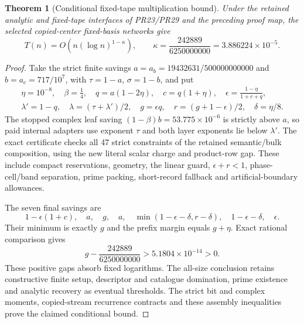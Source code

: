 \documentclass[11pt]{article}
\newtheorem{theorem}{Theorem}
\begin{document}
\begin{theorem}[Conditional fixed-tape multiplication bound]
Under the retained analytic and fixed-tape interfaces of PR23/PR29
and the preceding proof map, the selected copied-center fixed-basis networks give
\[
 T(n)=O\!\left(n(\log n)^{1-\kappa}\right),\qquad
 \boxed{\kappa=\frac{242889}{6250000000}=3.886224\times10^{-5}}.
\]
\end{theorem}
\begin{proof}
Take the strict finite savings $a=a_b=19432631/500000000000$ and
$b=a_c=717/10^7$, with $\tau=1-a$, $\sigma=1-b$, and put
\[
\begin{gathered}
 \eta=10^{-8},\quad\beta=\tfrac14,\quad q=a(1-2\eta),\quad
 c=q(1+\eta),\quad\epsilon=\frac{1-\eta}{1+c+q},\\
 \lambda'=1-q,\quad\lambda=(\tau+\lambda')/2,\quad
 g=\epsilon q,\quad r=(g+1-\epsilon)/2,\quad\delta=\eta/8.
\end{gathered}
\]
The stopped complex leaf saving $(1-\beta)b=53.775\times10^{-6}$
is strictly above $a$, so paid internal adapters use exponent $\tau$
and both layer exponents lie below $\lambda'$. The exact certificate
checks all 47 strict constraints of the retained semantic/bulk
composition, using the new literal scalar charge and product-row gap.
These include compact reservations, geometry, the linear guard,
$\epsilon+r<1$, phase-cell/band separation, prime packing, short-record
fallback and artificial-boundary allowances.

The seven final savings are
\[
 1-\epsilon(1+c),\quad a,\quad g,\quad a,\quad
 \min(1-\epsilon-\delta,r-\delta),\quad
 1-\epsilon-\delta,\quad\epsilon.
\]
Their minimum is exactly $g$ and the prefix margin equals $g+\eta$.
Exact rational comparison gives
\[
 g-\frac{242889}{6250000000}>5.1804\times10^{-14}>0.
\]
These positive gaps absorb fixed logarithms. The all-size conclusion
retains constructive finite setup, descriptor and catalogue domination,
prime existence and analytic recovery as eventual thresholds. The
strict bit and complex moments, copied-stream recurrence contracts and
these assembly inequalities prove the claimed conditional bound.
\end{proof}
\end{document}
